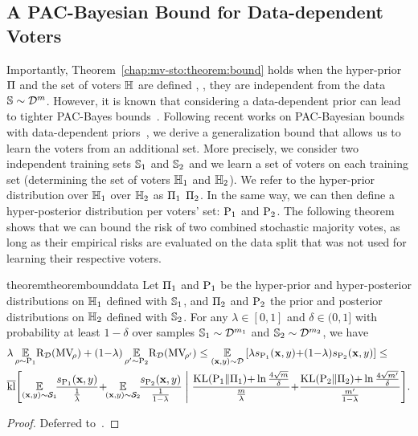 \subsection{A PAC-Bayesian Bound for Data-dependent Voters}
\label{chap:mv-sto:sec:bound-data}

Importantly, Theorem~\ref{chap:mv-sto:theorem:bound} holds when the hyper-prior $\hyperP$ and the set of voters $\H$ are defined \apriori, \ie, they are independent from the data $\S\sim\D^{\m}$.
However, it is known that considering a data-dependent prior can lead to tighter PAC-Bayes bounds~\citep{ParradoHernandezAmbroladzeShaweTaylorSun2012,DziugaiteHsuGharbiehArpinoRoy2021}.
Following recent works on PAC-Bayesian bounds with data-dependent priors~\citep{ThiemannIgelWintenbergerSeldin2017,MhammediGrunwaldGuedj2019}, we derive a generalization bound that allows us to learn the voters from an additional set.
More precisely, we consider two independent training sets $\S_1$ and $\S_2$ and we learn a set of voters on each training set (determining the set of voters $\H_1$ and $\H_2$).
We refer to the hyper-prior distribution over $\H_1$ \resp over $\H_2$ as $\hyperP_1$ \resp $\hyperP_2$.
In the same way, we can then define a hyper-posterior distribution per voters' set: $\hyperQ_1$ and $\hyperQ_2$.
The following theorem shows that we can bound the risk of two combined stochastic majority votes, as long as their empirical risks are evaluated on the data split that was not used for learning their respective voters.

\begin{restatable}{theorem}{theorembounddata}\label{chap:mv-sto:theorem:bound-data}
Let $\hyperP_1$ and $\hyperQ_1$ be the hyper-prior and hyper-posterior distributions on $\H_1$ defined with $\S_1$, and $\hyperP_2$ and $\hyperQ_2$ the prior and posterior distributions on $\H_2$ defined with $\S_2$.
For any $\lambda \in [0, 1]$ and $\delta \in (0,1]$ with probability at least $1{-}\delta$ over samples $\S_1\sim\D^{\m_1}$ and $\S_2\sim\D^{\m_2}$, 
we have
\begin{align*}
    &\lambda\EE_{\Q\sim\hyperQ_1}\!\Risk_{\D}(\MVQ) + (1{-}\lambda)\EE_{\Qp\sim\hyperQ_2}\!\Risk_{\D}(\MVQp) \le \EE_{(\x,\y)\sim\D}\LB \lambda s_{\hyperQ_1}(\x,\y){+}(1{-}\lambda)s_{\hyperQ_2}(\x,\y) \RB \le\\ 
    &\klmax\!\LB \EE_{(\x,\y)\sim\dS_1}\!\!\frac{s_{\hyperQ_1}(\x, \y)}{\tfrac{1}{\lambda}}{+}\!\!\EE_{(\x,\y)\sim\dS_2}\!\!\frac{s_{\hyperQ_2}(\x, \y)}{\tfrac{1}{1{-}\lambda}} \;\middle|\; \frac{\KL(\hyperQ_1\|\hyperP_1){+}\ln\tfrac{4\sqrt{\m}}{\delta}}{\frac{\m}{\lambda}}{+}\frac{\KL(\hyperQ_2\|\hyperP_2){+}\ln\tfrac{4\sqrt{\mp}}{\delta}}{\frac{\mp}{1{-}\lambda}}\RB\!.
\end{align*}
\end{restatable}
\begin{noaddcontents}\begin{proof}
Deferred to~.
\end{proof}\end{noaddcontents}

